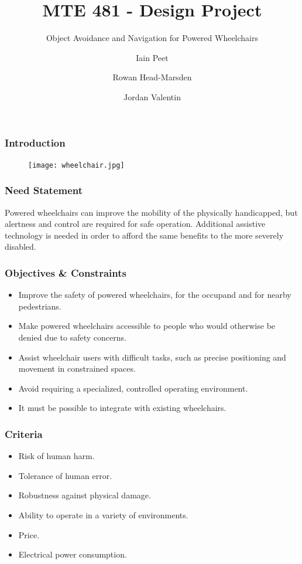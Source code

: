 \documentclass{beamer}
\title{MTE 481 - Design Project}
\subtitle{Object Avoidance and Navigation for Powered Wheelchairs}
\author{Iain Peet \and Rowan Head-Marsden \and Jordan Valentin}
\begin{document}
\begin{frame}
  \titlepage
\end{frame}

\begin{frame}
  \frametitle{Introduction}
  \begin{figure}
    \centering
    \texttt{[image: wheelchair.jpg]} 
  \end{figure}
\end{frame}

\begin{frame}
  \frametitle{Need Statement}
  Powered wheelchairs can improve the mobility of the physically handicapped, but 
  alertness and control are required for safe operation.
  Additional assistive technology is needed in order to afford the same benefits
  to the more severely disabled.
\end{frame}

\begin{frame}
  \frametitle{Objectives \& Constraints}
  \begin{itemize}
    \item Improve the safety of powered wheelchairs, for the occupand and for nearby pedestrians. \\
    \item Make powered wheelchairs accessible to people who would otherwise be denied due to safety concerns. \\
    \item Assist wheelchair users with difficult tasks, such as precise positioning and movement in constrained spaces.  \\
    \item Avoid requiring a specialized, controlled operating environment. \\
    \item It must be possible to integrate with existing wheelchairs. \\
  \end{itemize}
\end{frame}

\begin{frame}
  \frametitle{Criteria}
  \begin{itemize}
    \item Risk of human harm.\\
    \item Tolerance of human error.\\
    \item Robustness against physical damage.\\
    \item Ability to operate in a variety of environments. \\
    \item Price.\\
    \item Electrical power consumption.\\
  \end{itemize}
\end{frame}
\end{document}

